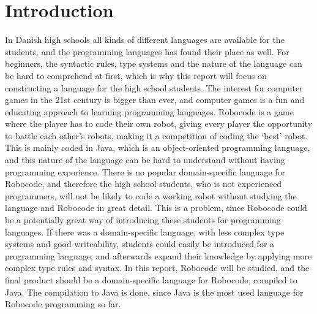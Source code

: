 \chapter{Introduction}

In Danish high schools all kinds of different languages are available for the students, and the programming languages has found their place as well. For beginners, the syntactic rules, type systems and the nature of the language can be hard to comprehend at first, which is why this report will focus on constructing a language for the high school students. The interest for computer games in the 21st century is bigger than ever, and computer games is a fun and educating approach to learning programming languages. Robocode is a game where the player has to code their own robot, giving every player the opportunity to battle each other’s robots, making it a competition of coding the ‘best’ robot. This is mainly coded in Java, which is an object-oriented programming language, and this nature of the language can be hard to understand without having programming experience. There is no popular domain-specific language for Robocode, and therefore the high school students, who is not experienced programmers, will not be likely to code a working robot without studying the language and Robocode in great detail.
This is a problem, since Robocode could be a potentially great way of introducing these students for programming languages. If there was a domain-specific language, with less complex type systems and good writeability, students could easily be introduced for a programming language, and afterwards expand their knowledge by applying more complex type rules and syntax. In this report, Robocode will be studied, and the final product should be a domain-specific language for Robocode, compiled to Java. The compilation to Java is done, since Java is the most used language for Robocode programming so far.
	